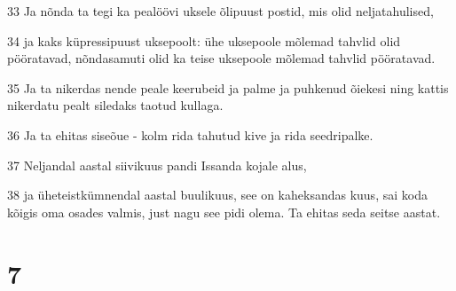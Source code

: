 \par 33 Ja nõnda ta tegi ka pealöövi uksele õlipuust postid, mis olid neljatahulised,
\par 34 ja kaks küpressipuust uksepoolt: ühe uksepoole mõlemad tahvlid olid pööratavad, nõndasamuti olid ka teise uksepoole mõlemad tahvlid pööratavad.
\par 35 Ja ta nikerdas nende peale keerubeid ja palme ja puhkenud õiekesi ning kattis nikerdatu pealt siledaks taotud kullaga.
\par 36 Ja ta ehitas siseõue - kolm rida tahutud kive ja rida seedripalke.
\par 37 Neljandal aastal siivikuus pandi Issanda kojale alus,
\par 38 ja üheteistkümnendal aastal buulikuus, see on kaheksandas kuus, sai koda kõigis oma osades valmis, just nagu see pidi olema. Ta ehitas seda seitse aastat.

\chapter{7}

